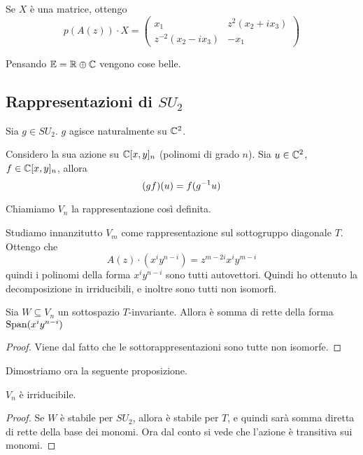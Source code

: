 Se $X$ è una matrice, ottengo
\[
	p(A(z))\cdot X = \left( 
	\begin{matrix}
		x_1 & z^2(x_2+ix_3) \\
		z^{-2}(x_2-ix_3) & -x_1
	\end{matrix}
	\right)
\]

Pensando $\mathbb E = \mathbb R \oplus \mathbb C$ vengono cose belle.

\subsection{Rappresentazioni di $SU_2$}
	Sia $g \in SU_2$. $g$ agisce naturalmente su $\mathbb C^2$.
	
	Considero la sua azione su $\mathbb C[x,y]_n$ (polinomi di grado $n$). Sia $u \in \mathbb C^2$, $f \in \mathbb C[x,y]_n$, allora 
	\[
	 (gf)(u) = f(g^{-1} u)
	\]
	
	Chiamiamo $V_n$ la rappresentazione così definita.

	Studiamo innanzitutto $V_m$ come rappresentazione sul sottogruppo diagonale $T$.
	Ottengo che 
	\[
		A(z) \cdot (x^i y^{n-i}) = z^{m-2i}x^iy^{m-i}
	\]
	quindi i polinomi della forma $x^iy^{n-i}$ sono tutti autovettori. Quindi ho ottenuto la decomposizione in irriducibili, e inoltre sono tutti non isomorfi.
	
	\begin{mylemma}
	 Sia $W\subseteq V_n$ un sottospazio $T$-invariante. Allora è somma di rette della forma $\operatorname{Span}(x^iy^{n-i})$
	\end{mylemma}
	\begin{proof}
		Viene dal fatto che le sottorappresentazioni sono tutte non isomorfe.
	\end{proof}

	Dimostriamo ora la seguente proposizione.
	\begin{myprop}
	 $V_n$ è irriducibile.
	\end{myprop}
	\begin{proof}
	 Se $W$ è stabile per $SU_2$, allora è stabile per $T$, e quindi sarà somma diretta di rette della base dei monomi. Ora dal conto si vede che l'azione è transitiva sui monomi. 
	\end{proof}


	



